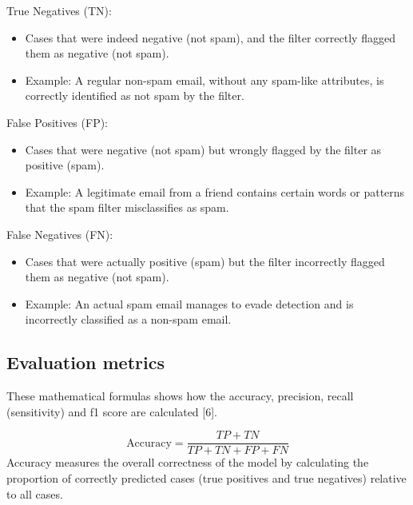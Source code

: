 True Negatives (TN):
\begin{itemize}
  \item Cases that were indeed negative (not spam), and the filter correctly flagged them as negative (not spam).
  \item Example: A regular non-spam email, without any spam-like attributes, is correctly identified as not spam by the filter.
\end{itemize}

False Positives (FP):
\begin{itemize}
  \item Cases that were negative (not spam) but wrongly flagged by the filter as positive (spam).
  \item Example: A legitimate email from a friend contains certain words or patterns that the spam filter misclassifies as spam.
\end{itemize}

False Negatives (FN):
\begin{itemize}
  \item Cases that were actually positive (spam) but the filter incorrectly flagged them as negative (not spam).
  \item Example: An actual spam email manages to evade detection and is incorrectly classified as a non-spam email.
\end{itemize}



\subsection{Evaluation metrics}

These mathematical formulas shows how the accuracy, precision, recall (sensitivity) and f1 score are calculated [6].

\[
  \text{Accuracy} = \frac{TP + TN}{TP + TN + FP + FN}
\]
\indent Accuracy measures the overall correctness of the model by calculating the proportion of correctly predicted cases (true positives and true negatives) relative to all cases.

